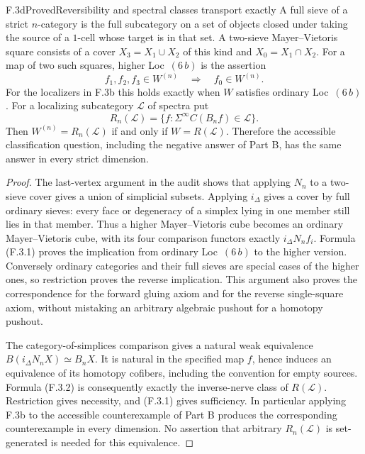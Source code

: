 \begin{claim}{F.3d}{Proved}{Reversibility and spectral classes transport exactly}
A full sieve of a strict $n$-category is the full subcategory on a
set of objects closed under taking the source of a $1$-cell whose
target is in that set. A two-sieve Mayer--Vietoris square consists
of a cover $X_3=X_1\cup X_2$ of this kind and $X_0=X_1\cap X_2$.
For a map of two such squares, higher Loc~$(6\,b)$ is the assertion
\[
 f_1,f_2,f_3\in W^{(n)}\quad\Longrightarrow\quad f_0\in W^{(n)}.
\]
For the localizers in F.3b this holds exactly when $W$ satisfies
ordinary Loc~$(6\,b)$. For a localizing subcategory $\mathcal L$
of spectra put
\[
 R_n(\mathcal L)=
 \{f:\Sigma^\infty C(B_nf)\in\mathcal L\}.           \tag{F.3.2}
\]
Then $W^{(n)}=R_n(\mathcal L)$ if and only if
$W=R(\mathcal L)$. Therefore the accessible classification question,
including the negative answer of Part B, has the same answer in
every strict dimension.
\end{claim}
\begin{proof}
The last-vertex argument in the audit shows that applying $N_n$
to a two-sieve cover gives a union of simplicial subsets.
Applying $i_\Delta$ gives a cover by full ordinary sieves: every
face or degeneracy of a simplex lying in one member still lies in
that member. Thus a higher Mayer--Vietoris cube becomes an ordinary
Mayer--Vietoris cube, with its four comparison functors exactly
$i_\Delta N_nf_i$. Formula (F.3.1) proves the implication from
ordinary Loc~$(6\,b)$ to the higher version. Conversely ordinary
categories and their full sieves are special cases of the higher
ones, so restriction proves the reverse implication. This argument
also proves the correspondence for the forward gluing axiom and
for the reverse single-square axiom, without mistaking an arbitrary
algebraic pushout for a homotopy pushout.

The category-of-simplices comparison gives a natural weak
equivalence $B(i_\Delta N_nX)\simeq B_nX$. It is natural in the
specified map $f$, hence induces an equivalence of its homotopy
cofibers, including the convention for empty sources. Formula
(F.3.2) is consequently exactly the inverse-nerve class of
$R(\mathcal L)$. Restriction gives necessity, and (F.3.1) gives
sufficiency. In particular applying F.3b to the accessible
counterexample of Part B produces the corresponding counterexample
in every dimension. No assertion that arbitrary $R_n(\mathcal L)$
is set-generated is needed for this equivalence.
\end{proof}

